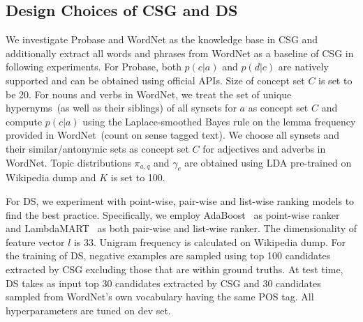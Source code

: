 

\subsection{Design Choices of CSG and DS}
\label{sec:ablation}

We investigate Probase and WordNet as the knowledge base in CSG and additionally extract all words and phrases from WordNet as a baseline of CSG in following experiments. For Probase, both $p(c|a)$ and $p(d|c)$ are natively supported and can be obtained using official APIs. Size of concept set $C$ is set to be 20. For nouns and verbs in WordNet, we treat the set of unique hypernyms~(as well as their siblings) of all synsets for $a$ as concept set $C$ and compute
$p(c|a)$ using the Laplace-smoothed Bayes rule on the lemma frequency provided in WordNet~(count on sense tagged text). We choose all synsets and their similar/antonymic sets as concept set $C$ for adjectives and adverbs in WordNet. Topic distributions $\pi_{a,q}$ and $\gamma_c$ are obtained using LDA pre-trained on Wikipedia dump and $K$ is set to 100.

For DS, we experiment with point-wise, pair-wise and list-wise ranking models to find the best practice.
Specifically, we employ AdaBoost~\cite{freund1997decision} as point-wise ranker and LambdaMART~\cite{burges2010from} as both pair-wise and list-wise ranker. The dimensionality of feature vector $l$ is 33. Unigram frequency is calculated on Wikipedia dump. For the training of DS, negative examples are sampled using top 100 candidates extracted by CSG excluding those that are within ground truths. At test time, DS takes as input top 30 candidates extracted by CSG 
and 30 candidates sampled from WordNet's own vocabulary having the same POS tag. All hyperparameters are tuned on dev set.



